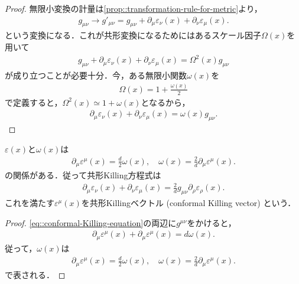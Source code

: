 \begin{proof}
	無限小変換の計量は\cref{prop::transformation-rule-for-metric}より，
	\begin{align}
		g_{\mu\nu}\longrightarrow{}g'_{\mu\nu}=g_{\mu\nu}+\partial_{\mu}\varepsilon_{\nu}(x)+\partial_{\nu}\varepsilon_{\mu}(x).
	\end{align}
	という変換になる．これが共形変換になるためにはあるスケール因子\(\Omega(x)\)を用いて
	\begin{align}
		g_{\mu\nu}+\partial_{\mu}\varepsilon_{\nu}(x)+\partial_{\nu}\varepsilon_{\mu}(x)=\Omega^{2}(x)g_{\mu\nu}
	\end{align}
	が成り立つことが必要十分．今，ある無限小関数\(\omega(x)\)を
	\begin{align}
		\Omega(x)=1+\frac{\omega(x)}{2}
	\end{align}
	で定義すると，\(\Omega^{2}(x)\simeq{}1+\omega(x)\)となるから，
	\begin{align}
		\partial_{\mu}\varepsilon_{\nu}(x)+\partial_{\nu}\varepsilon_{\mu}(x)=\omega(x)g_{\mu\nu}.
	\end{align}
\end{proof}
\begin{prop}
	\(\varepsilon(x)\)と\(\omega(x)\)は
	\begin{align}\label{eq::infinitesimal-scale-factor-and-conformal-killing-vector}
		\partial_{\mu}\varepsilon^{\mu}(x)=\frac{d}{2}\omega(x),\quad{}\omega(x)=\frac{2}{d}\partial_{\mu}\varepsilon^{\mu}(x).
	\end{align}
	の関係がある．従って共形Killing方程式は
	\begin{align}
		\partial_{\mu}\varepsilon_{\nu}(x)+\partial_{\nu}\varepsilon_{\mu}(x)=\frac{2}{d}g_{\mu\nu}\partial_{\rho}\varepsilon_{\rho}(x).
	\end{align}
	これを満たす\(\varepsilon^{\mu}(x)\)を共形Killingベクトル (conformal Killing vector) という．
\end{prop}
\begin{proof}
	\cref{eq::conformal-Killing-equation}の両辺に\(g^{\mu\nu}\)をかけると，
	\begin{align}
		\partial_{\mu}\varepsilon^{\mu}(x)+\partial_{\mu}\varepsilon^{\mu}(x)=d\omega(x).
	\end{align}
	従って，\(\omega(x)\)は
	\begin{align}
		\partial_{\mu}\varepsilon^{\mu}(x)=\frac{d}{2}\omega(x),\quad{}\omega(x)=\frac{2}{d}\partial_{\mu}\varepsilon^{\mu}(x).
	\end{align}
	で表される．
\end{proof}
